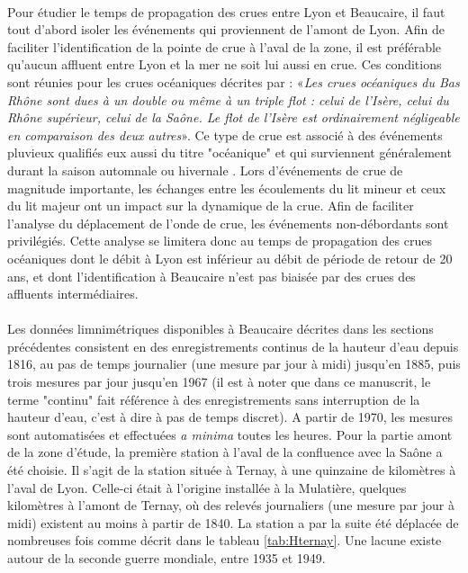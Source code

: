 	\paragraph{} Pour étudier le temps de propagation des crues entre Lyon et Beaucaire, il faut tout d'abord isoler les événements qui proviennent de l'amont de Lyon. Afin de faciliter l'identification de la pointe de crue à l'aval de la zone, il est préférable qu'aucun affluent entre Lyon et la mer ne soit lui aussi en crue. Ces conditions sont réunies pour les crues océaniques décrites par \citet{parde_regime_1919} : «\textit{Les crues océaniques du Bas Rhône sont dues à un double ou même à un triple flot : celui de l'Isère, celui du Rhône supérieur, celui de la Saône. Le flot de l'Isère est ordinairement négligeable en comparaison des deux autres}». Ce type de crue est associé à des événements pluvieux qualifiés eux aussi du titre "océanique" et qui surviennent généralement durant la saison automnale ou hivernale \citep{parde_regime_1925}. Lors d'événements de crue de magnitude importante, les échanges entre les écoulements du lit mineur et ceux du lit majeur ont un impact sur la dynamique de la crue. Afin de faciliter l'analyse du déplacement de l'onde de crue, les événements non-débordants sont privilégiés. Cette analyse se limitera donc au temps de propagation des crues océaniques dont le débit à Lyon est inférieur au débit de période de retour de 20 ans, et dont l'identification à Beaucaire n'est pas biaisée par des crues des affluents intermédiaires. 
	
	\paragraph{} Les données limnimétriques disponibles à Beaucaire décrites dans les sections précédentes consistent en des enregistrements continus de la hauteur d'eau depuis 1816, au pas de temps journalier (une mesure par jour à midi) jusqu'en 1885, puis trois mesures par jour jusqu'en 1967 (il est à noter que dans ce manuscrit, le terme "continu" fait référence à des enregistrements sans interruption de la hauteur d'eau, c'est à dire à pas de temps discret). A partir de 1970, les mesures sont automatisées et effectuées \textit{a minima} toutes les heures. Pour la partie amont de la zone d'étude, la première station à l'aval de la confluence avec la Saône a été choisie. Il s'agit de la station située à Ternay, à une quinzaine de kilomètres à l'aval de Lyon. Celle-ci était à l'origine installée à la Mulatière, quelques kilomètres à l'amont de Ternay, où des relevés journaliers (une mesure par jour à midi) existent au moins à partir de 1840. La station a par la suite été déplacée de nombreuses fois comme décrit dans le tableau \ref{tab:Hternay}. Une lacune existe autour de la seconde guerre mondiale, entre 1935 et 1949. 
	
